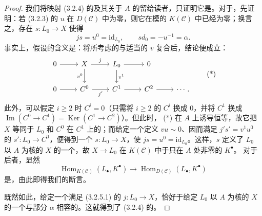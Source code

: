 \begin{proof}
我们将映射 (3.2.4) 的及其关于 $A$ 的留给读者，只证明它是。对于，先证明：若 (3.2.3) 的 $u$ 在 $D(\mathcal C)$ 中为零，则它在模的 $K(\mathcal C)$ 中已经为零；换言之，存在 $s:L_0\to X$ 使得
\[
js=u^0=\mathrm{id}_{L_0},\qquad sd_0=-u^{-1}=\alpha.\tag{3.2.5.1}
\]
事实上，假设的含义是：将所考虑的与适当的 $v$ 复合后，结论便成立：
\[
\begin{tikzcd}
0\arrow[r]&X\arrow[r,"j"]\arrow[d,"v^0"']&L_0\arrow[r]\arrow[d,"v^1"]&0\\
0\arrow[r]&C^0\arrow[r,"j'"']&C^1\arrow[r]&C^2\arrow[r]&\cdots.
\end{tikzcd}\tag{*}
\]
此外，可以假定 $i\geq2$ 时 $C^i=0$（只需将 $i\geq2$ 的 $C^i$ 换成 $0$，并将 $C^1$ 换成 $\operatorname{Im}(C^0\to C^1)=\operatorname{Ker}(C^1\to C^2)$）。但此时， (*) 在 $A$ 上诱导恒等，故它把 $X$ 等同于 $L_0$ 和 $C^0$ 在 $C^1$ 上的；而给定一个定义 $vu\sim0$、因而满足 $j's'=v^1u^0$ 的 $s':L_0\to C^0$，便得到一个 $s:L_0\to X$，使 $js=u^0=\mathrm{id}_{L_0}$。这样，$s$ 定义了 $L_0$ 以 $A$ 为核的 $X$ 的一个，故 $X\to L_0$ 在 $K(\mathcal C)$ 中于只在 $A$ 处非零的 $K^\bullet$。
对于后者，显然
\[
\operatorname{Hom}_{K(\mathcal C)}(L_\bullet,K^\bullet)
\longrightarrow\operatorname{Hom}_{D(\mathcal C)}(L_\bullet,K^\bullet)
\]
是，由此即得我们的断言。

既然如此，给定一个满足 (3.2.5.1) 的 $j:L_0\to X$，恰好于给定 $L_0$ 以 $A$ 为核的 $X$ 的一个与部分 $\alpha$ 相容的。这就得到了 (3.2.4) 的。


\end{proof}
